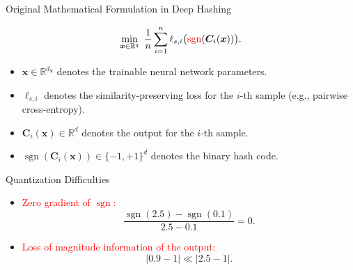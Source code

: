 \documentclass[mathserif,compress,override,9pt]{beamer}
\numberwithin{equation}{section}
\newcommand{\RR}{\mathbb{R}}
\newcommand{\bx}{\bm{x}}
\newcommand{\bC}{\bm{C}}
\newcommand{\red}[1]{\textcolor{red}{#1}}
\theoremstyle{remark}
\begin{document}
\begin{frame}[t]{Original Mathematical Formulation in Deep Hashing}
\vspace{0.1cm}

\[
\min_{\bx\in \RR^q}\
\frac{1}{n}\sum_{i=1}^{n}
\ell_{s,i}\bigl(\red{\operatorname{sgn}}(\bC_i(\bx))\bigr).
\]

\vspace{-0.06cm}
\begin{itemize}
  \item $\bx\in\RR^{d_{\bx}}$ denotes the trainable neural network parameters.
  \item $\ell_{s,i}$ denotes the similarity-preserving loss for the $i$-th sample (e.g., pairwise cross-entropy).
  \item $\bC_i(\bx)\in\RR^d$ denotes the output for the $i$-th sample.
  \item $\operatorname{sgn}(\bC_i(\bx))\in\{-1,+1\}^d$ denotes the binary hash code.
\end{itemize}

\vspace{0.06cm}
\begin{block}{Quantization Difficulties}
\small
\begin{itemize}
\item[$\triangleright$] \red{Zero gradient of $\operatorname{sgn}$:}
\[
\frac{\operatorname{sgn}(2.5)-\operatorname{sgn}(0.1)}{2.5-0.1}=0.
\]
\item[$\triangleright$] \red{Loss of magnitude information of the output:}
\[
|0.9-1|\ll|2.5-1|.
\]
\end{itemize}
\end{block}

\vspace{-0.04cm}

\end{frame}
\end{document}
